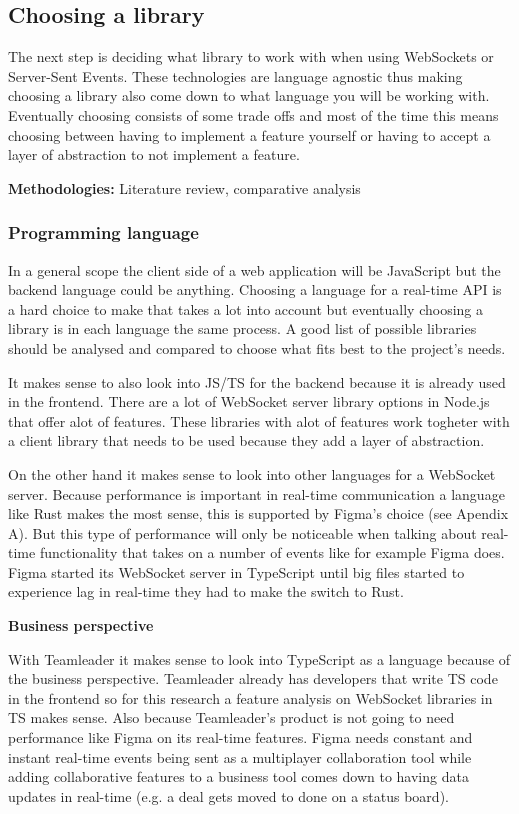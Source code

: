 \newpage

\subsection{Choosing a library}

The next step is deciding what library to work with when using WebSockets or Server-Sent Events. These technologies are language agnostic thus making choosing a library also come down to what language you will be working with. Eventually choosing consists of some trade offs and most of the time this means choosing between having to implement a feature yourself or having to accept a layer of abstraction to not implement a feature.

\textbf{Methodologies:} Literature review, comparative analysis

\subsubsection{Programming language}

In a general scope the client side of a web application will be JavaScript but the backend language could be anything. Choosing a language for a real-time API is a hard choice to make that takes a lot into account but eventually choosing a library is in each language the same process. A good list of possible libraries should be analysed and compared to choose what fits best to the project's needs.

It makes sense to also look into JS/TS for the backend because it is already used in the frontend. There are a lot of WebSocket server library options in Node.js that offer alot of features. These libraries with alot of features work togheter with a client library that needs to be used because they add a layer of abstraction.

On the other hand it makes sense to look into other languages for a WebSocket server. Because performance is important in real-time communication a language like Rust makes the most sense, this is supported by Figma's choice (see Apendix A). But this type of performance will only be noticeable when talking about real-time functionality that takes on a number of events like for example Figma does. Figma started its WebSocket server in TypeScript until big files started to experience lag in real-time they had to make the switch to Rust.

\textbf{Business perspective}

With Teamleader it makes sense to look into TypeScript as a language because of the business perspective. Teamleader already has developers that write TS code in the frontend so for this research a feature analysis on WebSocket libraries in TS makes sense. Also because Teamleader's product is not going to need performance like Figma on its real-time features. Figma needs constant and instant real-time events being sent as a multiplayer collaboration tool while adding collaborative features to a business tool comes down to having data updates in real-time (e.g. a deal gets moved to done on a status board).

